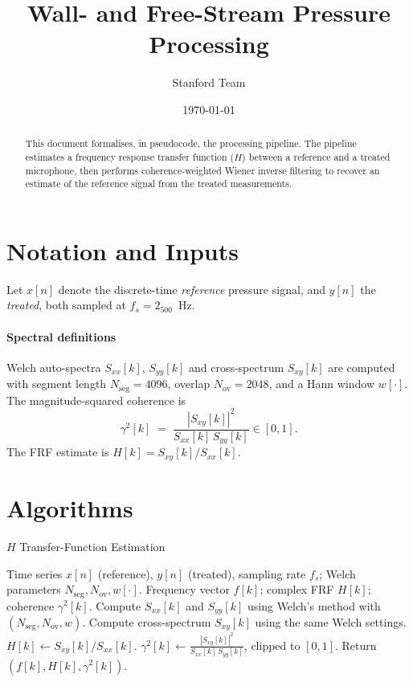 \documentclass[a4paper,11pt]{article}
\title{Wall- and Free-Stream Pressure Processing}
\author{Stanford Team}
\date{\today}
\begin{document}
\maketitle

\begin{abstract}
    This document formalises, in pseudocode, the processing pipeline. The pipeline estimates a frequency response  transfer function ($H$) between a reference and a treated microphone, then performs coherence-weighted Wiener inverse filtering to recover an estimate of the reference signal from the treated measurements.
\end{abstract}


\section{Notation and Inputs}
    Let $x[n]$ denote the discrete-time \emph{reference} pressure signal, and $y[n]$ the \emph{treated}, both sampled at $f_s=2_500$~Hz.

    \paragraph{Spectral definitions}
    Welch auto-spectra $S_{xx}[k]$, $S_{yy}[k]$ and cross-spectrum $S_{xy}[k]$ are computed with segment length $N_{\mathrm{seg}}=4096$, overlap $N_{\mathrm{ov}}=2048$, and a Hann window $w[\cdot]$. The magnitude-squared coherence is
    \begin{equation}
        \gamma^2[k] \;=\; \frac{|S_{xy}[k]|^2}{S_{xx}[k]\,S_{yy}[k]}\in[0,1].
    \end{equation}
    The FRF estimate is $H[k] = S_{xy}[k]/S_{xx}[k]$.

\section{Algorithms}

\begin{algorithm}
    \caption{$H$ Transfer-Function Estimation}
    \label{alg:H}
    \begin{algorithmic}[1]
        \Require Time series $x[n]$ (reference), $y[n]$ (treated), sampling rate $f_s$; Welch parameters $N_{\mathrm{seg}}, N_{\mathrm{ov}}, w[\cdot]$.
        \Ensure Frequency vector $f[k]$; complex FRF $H[k]$; coherence $\gamma^2[k]$.
        \State Compute $S_{xx}[k]$ and $S_{yy}[k]$ using Welch's method with $(N_{\mathrm{seg}}, N_{\mathrm{ov}}, w)$.
        \State Compute cross-spectrum $S_{xy}[k]$ using the same Welch settings.
        \State $H[k] \gets S_{xy}[k]/S_{xx}[k]$.
        \State $\gamma^2[k] \gets \frac{|S_{xy}[k]|^2}{S_{xx}[k]\,S_{yy}[k]}$, clipped to $[0,1]$.
        \State Return $(f[k], H[k], \gamma^2[k])$.
    \end{algorithmic}
\end{algorithm}
\end{document}
